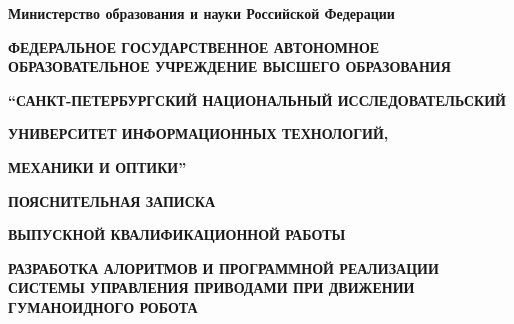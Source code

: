 \begin{titlepage} 
\begin{center}
    \textbf{Министерство образования и науки Российской Федерации}

    {\fontsize{8pt}{10pt} \selectfont \textbf{ФЕДЕРАЛЬНОЕ ГОСУДАРСТВЕННОЕ АВТОНОМНОЕ ОБРАЗОВАТЕЛЬНОЕ УЧРЕЖДЕНИЕ ВЫСШЕГО ОБРАЗОВАНИЯ}}

    \textbf{“САНКТ-ПЕТЕРБУРГСКИЙ НАЦИОНАЛЬНЫЙ ИССЛЕДОВАТЕЛЬСКИЙ }

    \textbf{УНИВЕРСИТЕТ ИНФОРМАЦИОННЫХ ТЕХНОЛОГИЙ, }

    \textbf{МЕХАНИКИ И ОПТИКИ”}

    \bigskip
    \textbf{ПОЯСНИТЕЛЬНАЯ ЗАПИСКА}

    \textbf{ВЫПУСКНОЙ КВАЛИФИКАЦИОННОЙ РАБОТЫ}

    \vspace{4cm}

    \textbf{\large РАЗРАБОТКА АЛОРИТМОВ И ПРОГРАММНОЙ РЕАЛИЗАЦИИ СИСТЕМЫ УПРАВЛЕНИЯ ПРИВОДАМИ ПРИ ДВИЖЕНИИ ГУМАНОИДНОГО РОБОТА}
\end{center}

\vspace{4cm}

\end{titlepage}
